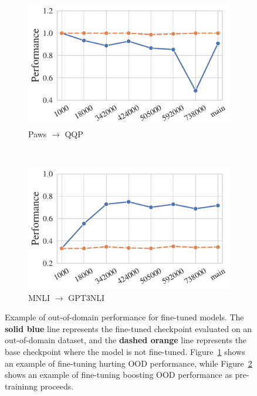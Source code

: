 \begin{figure}[t!]
    \begin{subfigure}[b]{0.5\textwidth}
    \centering
    \includegraphics[width=0.7\columnwidth]{figures/fig_files/ood/sft_evalqqp-trainpaws_main_display.pdf}
        \caption{Paws $\rightarrow$ QQP}
        \label{fig:ood:detrimental}
    \end{subfigure}%
    \\
    \begin{subfigure}[b]{0.5\textwidth}
        \centering
    \includegraphics[width=0.7\columnwidth]{figures/fig_files/ood/sft_evalgpt3nli-trainmnli_main_display.pdf}
        \caption{MNLI $\rightarrow$ GPT3NLI}
        \label{fig:ood:beneficial}
    \end{subfigure}
    \caption{Example of out-of-domain performance for fine-tuned models. The \textcolor{snsblue}{\textbf{solid blue}} line represents the fine-tuned checkpoint evaluated on an out-of-domain dataset, and the \textcolor{snsorange}{\textbf{dashed orange}} line represents the base checkpoint where the model is not fine-tuned. Figure~\ref{fig:ood:detrimental} shows an example of fine-tuning hurting OOD performance, while Figure~\ref{fig:ood:beneficial} shows an example of fine-tuning boosting OOD performance as pre-traininng proceeds. }
    \label{fig:findings:ood}
\end{figure}
